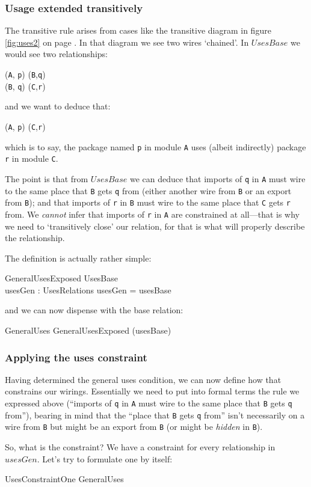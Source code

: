 \documentclass[a4paper,12pt]{article}
\begin{document}
\subsubsection*{Usage extended transitively}
The transitive rule arises from cases like the transitive diagram in figure \ref{fig:uses2} on page \pageref{fig:uses2}.
In that diagram we see two wires `chained'.  In $UsesBase$ we would see two relationships:
\begin{argue}
	({\tt A}, {\tt p}) \mapsto ({\tt B},{\tt q})		\\
	({\tt B}, {\tt q}) \mapsto ({\tt C},{\tt r})	
\end{argue}
and we want to deduce that:
\begin{argue}
	({\tt A}, {\tt p}) \mapsto  ({\tt C},{\tt r})	
\end{argue}
which is to say, the package named {\tt p} in module {\tt A} uses (albeit indirectly) package {\tt r} in module {\tt C}.

The point is that from $UsesBase$ we can deduce that imports of {\tt q} in {\tt A} must wire to the same place that {\tt B} gets {\tt q} from (either another wire from {\tt B} or an export from {\tt B}); and that imports of {\tt r} in {\tt B} must wire to the same place that {\tt C} gets {\tt r} from. We \emph{cannot} infer that imports of {\tt r} in {\tt A} are constrained at all---that is why we need to `transitively close' our relation, for that is what will properly describe the relationship.

The definition is actually rather simple:
\begin{schema}{GeneralUsesExposed}
	UsesBase		\\
	usesGen : UsesRelations
\where
	usesGen = usesBase \plus
\end{schema}
and we can now dispense with the base relation:
\begin{zed}
	GeneralUses  GeneralUsesExposed \hide (usesBase) 
\end{zed}

\subsubsection*{Applying the uses constraint}
Having determined the general uses condition, we can now define how that constrains our wirings. Essentially we need to put into formal terms the rule we expressed above (``imports of {\tt q} in {\tt A} must wire to the same place that {\tt B} gets {\tt q} from''), bearing in mind that the ``place that {\tt B} gets {\tt q} from'' isn't necessarily on a wire from {\tt B} but might be an export from {\tt B} (or might be \emph{hidden} in {\tt B}).

So, what is the constraint?  We have a constraint for every relationship in $usesGen$. Let's try to formulate one by itself:
\begin{schema}{UsesConstraintOne}
	GeneralUses	\\
	
\end{schema}
\end{document}
